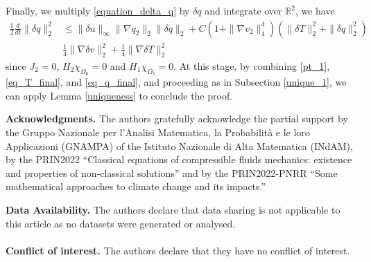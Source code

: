 \documentclass[11pt, a4paper, article,reqno,]{amsart}
\theoremstyle{remark}
\newenvironment{acknowledgments}{%
  \bigskip
  \noindent\textbf{Acknowledgments.}\quad}{\par}
\numberwithin{equation}{section}
\begin{document}
Finally, we multiply \eqref{equation_delta_q} by $\delta q$ and integrate over $\mathbb{R}^2$, we have
\begin{equation}\label{eq_q_final}
    \begin{aligned}
        \frac{1}{2}\frac{d}{dt} \|\delta q\|_2^2 & \leq \|\delta u\|_\infty \|\nabla q_2\|_2 \|\delta q\|_2 + C(1+ \|\nabla v_2\|_4^4)(\|\delta T\|_2^2 + \|\delta q\|_2^2) \\
        & \frac{1}{4}\|\nabla \delta v\|_2^2 + \frac{1}{4}\|\nabla \delta T\|_2^2
    \end{aligned}
\end{equation}
since $J_2 = 0$, $H_2\chi_{\Omega_6}=0$ and $H_1\chi_{\Omega_5} = 0$. At this stage, by combining \eqref{pt_1}, \eqref{eq_T_final}, and \eqref{eq_q_final}, and proceeding as in Subsection \ref{unique_1}, we can apply Lemma \ref{uniqueness} to conclude the proof.








\begin{acknowledgments}
The authors gratefully acknowledge the partial support by the Gruppo Na\-zio\-na\-le per l’Analisi Matematica, la Probabilit\`a e le loro
Applicazioni (GNAMPA) of the Istituto Nazionale di Alta Matematica (INdAM),  by the PRIN2022
``Classical equations of compressible fluids mechanics: existence and
properties of non-classical solutions'' and by the PRIN2022-PNRR ``Some
mathematical approaches to climate change and its impacts.''
\end{acknowledgments}

\vspace{1cm}
\textbf{Data Availability.} The authors declare that data sharing is not applicable to this article as no datasets were generated or analysed.
\\
\\
\textbf{Conflict of interest.} The authors declare that they have no conflict of interest.
\end{document}
